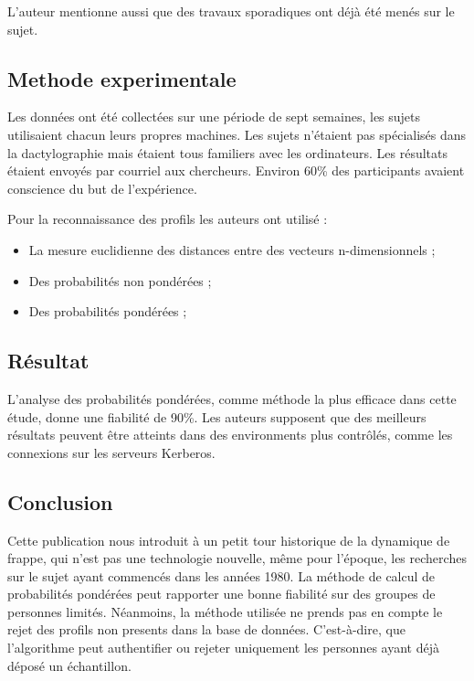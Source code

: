 L’auteur mentionne aussi que des travaux sporadiques ont déjà été menés sur le sujet.\\

\subsection{Methode experimentale}

Les données ont été collectées sur une période de sept semaines, les sujets utilisaient chacun leurs propres machines. Les sujets n’étaient pas spécialisés dans la dactylographie mais étaient tous familiers avec les ordinateurs. Les résultats étaient envoyés par courriel aux chercheurs. Environ 60\% des participants avaient conscience du but de l’expérience.

Pour la reconnaissance des profils les auteurs ont utilisé :\\

\begin{itemize}
\item La mesure euclidienne des distances entre des vecteurs n-dimensionnels ;
\item Des probabilités non pondérées ;
\item Des probabilités pondérées ;
\end{itemize}

\subsection{Résultat}

L’analyse des probabilités pondérées, comme méthode la plus efficace dans cette étude, donne une fiabilité de 90\%. Les auteurs supposent que des meilleurs résultats peuvent être atteints dans des environments plus contrôlés, comme les connexions sur les serveurs Kerberos.

\subsection{Conclusion}

Cette publication nous introduit à un petit tour historique de la dynamique de frappe, qui n'est pas une technologie nouvelle, même pour l'époque, les recherches sur le sujet ayant commencés dans les années 1980. La méthode de calcul de probabilités pondérées peut rapporter une bonne fiabilité sur des groupes de personnes limités. Néanmoins, la méthode utilisée ne prends pas en compte le rejet des profils non presents dans la base de données. C’est-à-dire, que l’algorithme peut authentifier ou rejeter uniquement les personnes ayant déjà déposé un échantillon.
